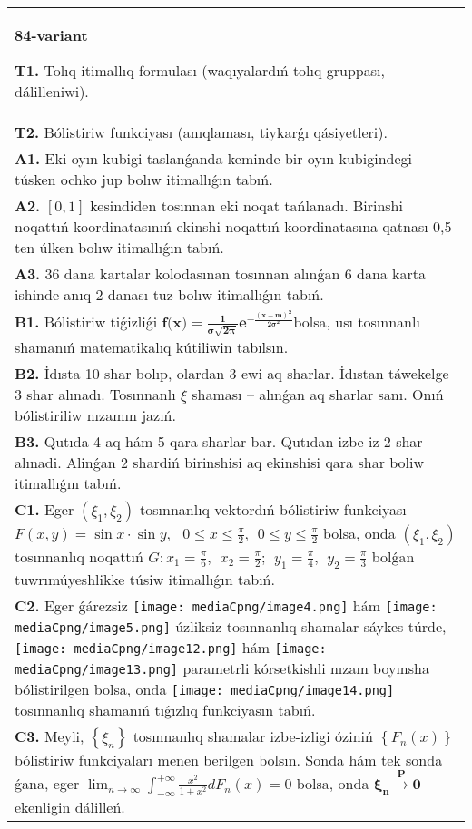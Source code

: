 \documentclass{article}
\begin{document}
\begin{tabular}{m{17cm}}
\textbf{84-variant}
\newline

\textbf{T1.} Tolıq itimallıq formulası (waqıyalardıń tolıq gruppası, dálilleniwi).
 \\
\textbf{T2.} Bólistiriw funkciyası (anıqlaması, tiykarǵı qásiyetleri).
 \\
\textbf{A1.} Eki oyın kubigi taslanǵanda keminde bir oyın kubigindegi túsken ochko jup bolıw itimallıǵın tabıń.
 \\
\textbf{A2.} $\left[ 0,1 \right]$ kesindiden tosınnan eki noqat tańlanadı. Birinshi noqattıń koordinatasınıń ekinshi noqattıń koordinatasına qatnası 0,5 ten úlken bolıw itimallıǵın tabıń.
 \\
\textbf{A3.} 36 dana kartalar kolodasınan tosınnan alınǵan 6 dana karta ishinde anıq 2 danası tuz bolıw itimallıǵın tabıń.
 \\
\textbf{B1.} Bólistiriw tiǵizliǵi \(\mathbf{f}\mathbf{(}\mathbf{x}\mathbf{)}\mathbf{=}\frac{\mathbf{1}}{\mathbf{\sigma}\sqrt{\mathbf{2}\mathbf{\pi}}}\mathbf{e}^{\mathbf{-}\frac{\left( \mathbf{x - m} \right)^{\mathbf{2}}}{\mathbf{2}\mathbf{\sigma}^{\mathbf{2}}}}\)bolsa, usı tosınnanlı shamanıń matematikalıq kútiliwin tabılsın.
 \\
\textbf{B2.} İdısta 10 shar bolıp, olardan 3 ewi aq sharlar. İdıstan táwekelge 3 shar alınadı. Tosınnanlı \(\xi\) shaması -- alınǵan aq sharlar sanı. Onıń bólistiriliw nızamın jazıń.
 \\
\textbf{B3.} Qutıda 4 aq hám 5 qara sharlar bar. Qutıdan izbe-iz 2 shar alınadi. Alinǵan 2 shardiń birinshisi aq ekinshisi qara shar boliw itimallıǵın tabıń.
 \\
\textbf{C1.} Eger \(\left( \xi_{1},\xi_{2} \right)\) tosınnanlıq vektordıń bólistiriw funkciyası\(F(x,y) = \sin x \cdot \sin y,\ \ \ 0 \leq x \leq \frac{\pi}{2},\ \ 0 \leq y \leq \frac{\pi}{2}\) bolsa, onda \(\left( \xi_{1},\xi_{2} \right)\) tosınnanlıq noqattıń \(G:x_{1} = \frac{\pi}{6},\ \ x_{2} = \frac{\pi}{2};\ \ y_{1} = \frac{\pi}{4},\ \ y_{2} = \frac{\pi}{3}\) bolǵan tuwrımúyeshlikke túsiw itimallıǵın tabıń.
 \\
\textbf{C2.} Eger ǵárezsiz \texttt{[image: mediaCpng/image4.png]} hám \texttt{[image: mediaCpng/image5.png]} úzliksiz tosınnanlıq shamalar sáykes túrde, \texttt{[image: mediaCpng/image12.png]} hám \texttt{[image: mediaCpng/image13.png]} parametrli kórsetkishli nızam boyınsha bólistirilgen bolsa, onda \texttt{[image: mediaCpng/image14.png]} tosınnanlıq shamanıń tıǵızlıq funkciyasın tabıń.
 \\
\textbf{C3.} Meyli, \(\left\{ \xi_{n} \right\}\) tosınnanlıq shamalar izbe-izligi óziniń \(\left\{ F_{n}(x) \right\}\) bólistiriw funkciyaları menen berilgen bolsın. Sonda hám tek sonda ǵana, eger \(\lim_{n \rightarrow \infty}\int_{- \infty}^{+ \infty}{\frac{x^{2}}{1 + x^{2}}dF_{n}(x)} = 0\) bolsa, onda \(\mathbf{\xi}_{\mathbf{n}}\overset{\mathbf{P}}{\rightarrow}\mathbf{0}\) ekenligin dálilleń.
 \\

\end{tabular}
\end{document}
